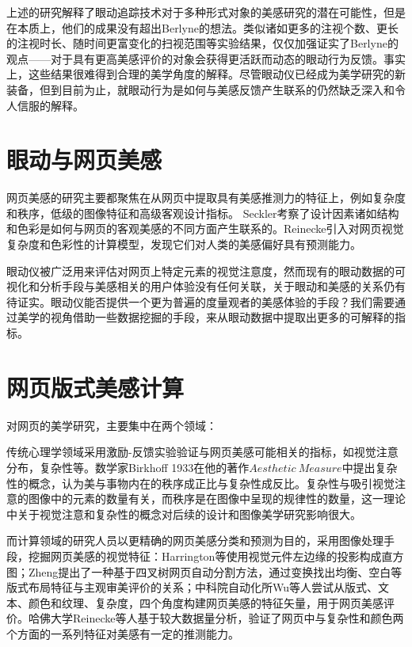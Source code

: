 上述的研究解释了眼动追踪技术对于多种形式对象的美感研究的潜在可能性，但是在本质上，他们的成果没有超出Berlyne的想法。类似诸如更多的注视个数、更长的注视时长、随时间更富变化的扫视范围等实验结果，仅仅加强证实了Berlyne的观点——对于具有更高美感评价的对象会获得更活跃而动态的眼动行为反馈。事实上，这些结果很难得到合理的美学角度的解释。尽管眼动仪已经成为美学研究的新装备，但到目前为止，就眼动行为是如何与美感反馈产生联系的仍然缺乏深入和令人信服的解释。


\section{眼动与网页美感}

网页美感的研究主要都聚焦在从网页中提取具有美感推测力的特征上，例如复杂度和秩序，低级的图像特征和高级客观设计指标。
Seckler考察了设计因素诸如结构和色彩是如何与网页的客观美感的不同方面产生联系的。Reinecke引入对网页视觉复杂度和色彩性的计算模型，发现它们对人类的美感偏好具有预测能力。

眼动仪被广泛用来评估对网页上特定元素的视觉注意度，然而现有的眼动数据的可视化和分析手段与美感相关的用户体验没有任何关联，关于眼动和美感的关系仍有待证实。眼动仪能否提供一个更为普遍的度量观者的美感体验的手段？我们需要通过美学的视角借助一些数据挖掘的手段，来从眼动数据中提取出更多的可解释的指标。


\section{网页版式美感计算}

对网页的美学研究，主要集中在两个领域：

传统心理学领域采用激励-反馈实验验证与网页美感可能相关的指标，如视觉注意分布，复杂性等。数学家Birkhoff 1933在他的著作$Aesthetic ~Measure$中提出复杂性的概念，认为美与事物内在的秩序成正比与复杂性成反比。复杂性与吸引视觉注意的图像中的元素的数量有关，而秩序是在图像中呈现的规律性的数量，这一理论中关于视觉注意和复杂性的概念对后续的设计和图像美学研究影响很大。

而计算领域的研究人员以更精确的网页美感分类和预测为目的，采用图像处理手段，挖掘网页美感的视觉特征：Harrington等使用视觉元件左边缘的投影构成直方图；Zheng提出了一种基于四叉树网页自动分割方法，通过变换找出均衡、空白等版式布局特征与主观审美评价的关系；中科院自动化所Wu等人尝试从版式、文本、颜色和纹理、复杂度，四个角度构建网页美感的特征矢量，用于网页美感评价。哈佛大学Reinecke等人基于较大数据量分析，验证了网页中与复杂性和颜色两个方面的一系列特征对美感有一定的推测能力。


